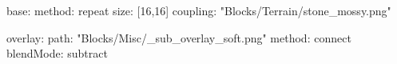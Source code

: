 base:
  method: repeat
  size: [16,16]
  coupling: "Blocks/Terrain/stone_mossy.png"

overlay:
  path: "Blocks/Misc/_sub_overlay_soft.png"
  method: connect
blendMode: subtract
